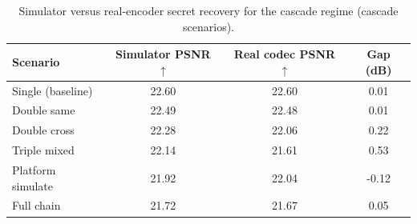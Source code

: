 \begin{table}[t]
\centering
\caption{Simulator versus real-encoder secret recovery for the cascade regime (cascade scenarios).}
\label{tab:cascade-cascade-gap}
\begin{tabular}{lccc}
\toprule
Scenario & Simulator PSNR $\uparrow$ & Real codec PSNR $\uparrow$ & Gap (dB) \\
\midrule
Single (baseline) & 22.60 & 22.60 & 0.01 \\
Double same & 22.49 & 22.48 & 0.01 \\
Double cross & 22.28 & 22.06 & 0.22 \\
Triple mixed & 22.14 & 21.61 & 0.53 \\
Platform simulate & 21.92 & 22.04 & -0.12 \\
Full chain & 21.72 & 21.67 & 0.05 \\
\bottomrule
\end{tabular}
\end{table}
